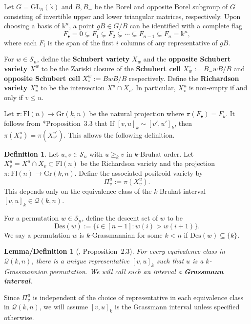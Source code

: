 \documentclass[12pt,reqno]{amsart}
\newtheorem{lem-def}[lemma]{Lemma/Definition}
\theoremstyle{definition}
\newtheorem{definition}[lemma]{Definition}
\newcommand{\GL}{\mathrm{GL}}
\renewcommand{\k}{\mathbb{k}}
\newcommand{\symm}{\mathcal{S}}
\newcommand{\gr}{\mathrm{Gr}}
\begin{document}
{Let $G = \GL_n(\k)$ and $B,B_-$ be the Borel and opposite Borel subgroup of $G$ consisting of invertible upper and lower triangular matrices, respectively. 
Upon choosing a basis of $\k^n$, a point $gB\in G/B$ can be identified with a complete flag $$F_{\bullet} = 0\subsetneq F_1 \subsetneq F_2 \subsetneq  \cdots \subsetneq F_{n-1}\subsetneq F_n  = \k^n,$$ where each $F_i$ is the span of the first $i$ columns of any representative of $gB$.

For $w\in\symm_n$, define the \textbf{Schubert variety} $X_w$ and the \textbf{opposite Schubert variety} $X^w$ to be the Zariski closure of the \textbf{Schubert cell} $X_w^\circ := B_-wB/B$ and \textbf{opposite Schubert cell} $X^w_\circ := BwB/B$ respectively. Define the \textbf{Richardson variety} $X_v^u$ to be the intersection $X^u\cap X_v$. In particular, $X_v^u$ is non-empty if and only if $v\leq u$. 


Let $\pi: \mathrm{Fl}(n) \rightarrow \gr(k,n)$ be the natural projection where
$\pi(F_{\bullet}) = F_k$. It follows from \cite{KLS2014projections}*{Proposition~3.3} that  If $[v,u]_k\sim [v',u']_k$, then $\pi(X_v^u) = \pi(X_{v'}^{u'})$. This allows the following definition.

\begin{definition}\label{def:projrichardson}
Let \(u,v\in\symm_n\) with \(u\ge_k v\) in \(k\)-Bruhat order.
Let \(X_v^u=X^u\cap X_v\subset \mathrm{Fl}(n)\) be the Richardson variety and the projection
\(\pi:\mathrm{Fl}(n)\to \gr(k,n)\).
Define the associated positroid variety by
\[
\Pi_v^u:=\pi(X_v^u).
\]
This depends only on the equivalence class of the \(k\)-Bruhat interval \([v,u]_k\in\mathcal Q(k,n)\).
\end{definition}



For a permutation $w\in \symm_n$, define the descent set of $w$ to be 
\[\mathrm{Des}(w):= \{i\in [n-1]:w(i)>w(i+1)\}.\]
We say a permutation $w$ is $k$-Grassmannian for some $k<n$ if $\mathrm{Des}(w)\subseteq \{k\}$.

\begin{lem-def}[\cite{KLS13juggling}, Proposition~2.3]
     For every equivalence class in $\mathcal{Q}(k,n)$, there is a unique representative $[v,u]_k$ such that $u$ is a $k$-Grassmannian permutation. We will call such an interval a \textbf{Grassmann interval}.
\end{lem-def}

Since $\Pi_v^u$ is independent of the choice of representative in each equivalence class in $\mathcal{Q}(k,n)$, we will assume $[v,u]_k$ is the Grassmann interval unless specified otherwise.


}
\end{document}

